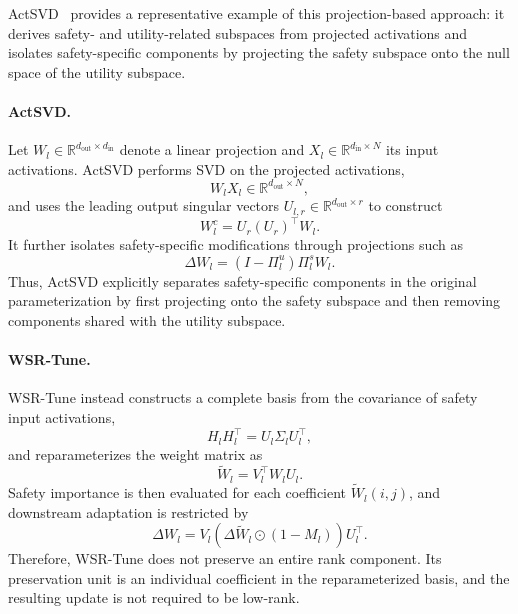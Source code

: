 \documentclass{article}
\begin{document}
ActSVD~\citep{assessing_the_brittleness} provides a representative example of this projection-based approach: it derives safety- and utility-related subspaces from projected activations and isolates safety-specific components by projecting the safety subspace onto the null space of the utility subspace.

\paragraph{ActSVD.}
Let $W_l\in\mathbb{R}^{d_{\mathrm{out}}\times d_{\mathrm{in}}}$ denote a linear projection and $X_l\in\mathbb{R}^{d_{\mathrm{in}}\times N}$ its input activations. ActSVD performs SVD on the projected activations,
\begin{equation}
    W_lX_l \in\mathbb{R}^{d_{\mathrm{out}}\times N},
\end{equation}
and uses the leading output singular vectors
$U_{l,r}\in\mathbb{R}^{d_{\mathrm{out}}\times r}$
to construct
\begin{equation}
    W_l^{c}
    =
    U_{r}
    (U_{r})^\top W_l.
\end{equation}
It further isolates safety-specific modifications through projections such as
\begin{equation}
    \Delta W_l
    =
    (I-\Pi_l^{u})\Pi_l^{s}W_l.
\end{equation}
Thus, ActSVD explicitly separates safety-specific components in the original parameterization by first projecting onto the safety subspace and then removing components shared with the utility subspace.

\paragraph{WSR-Tune.}
WSR-Tune instead constructs a complete basis from the covariance of safety input activations,
\begin{equation}
    H_lH_l^\top
    =
    U_l\Sigma_lU_l^\top,
\end{equation}
and reparameterizes the weight matrix as
\begin{equation}
    \widetilde W_l
    =
    V_l^\top W_lU_l.
\end{equation}
Safety importance is then evaluated for each coefficient
$\widetilde W_l(i,j)$, and downstream adaptation is restricted by
\begin{equation}
    \Delta W_l
    =
    V_l
    \left(
        \Delta\widetilde W_l
        \odot (1-M_l)
    \right)
    U_l^\top.
\end{equation}
Therefore, WSR-Tune does not preserve an entire rank component. Its preservation unit is an individual coefficient in the reparameterized basis, and the resulting update is not required to be low-rank.
\end{document}
